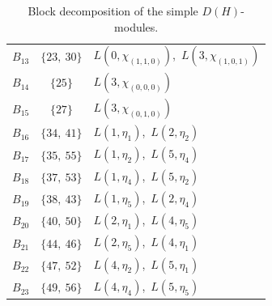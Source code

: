 \begin{table}[ht]
\begin{tabular}{c|c|l}
$B_{13}$ & $\{23,\ 30\}$ & $L(0,\chi_{(1,1,0)})$,\ $L(3,\chi_{(1,0,1)})$ \\
$B_{14}$ & $\{25\}$ & $L(3,\chi_{(0,0,0)})$ \\
$B_{15}$ & $\{27\}$ & $L(3,\chi_{(0,1,0)})$ \\
$B_{16}$ & $\{34,\ 41\}$ & $L(1,\eta_{1})$,\ $L(2,\eta_{2})$ \\
$B_{17}$ & $\{35,\ 55\}$ & $L(1,\eta_{2})$,\ $L(5,\eta_{4})$ \\
$B_{18}$ & $\{37,\ 53\}$ & $L(1,\eta_{4})$,\ $L(5,\eta_{2})$ \\
$B_{19}$ & $\{38,\ 43\}$ & $L(1,\eta_{5})$,\ $L(2,\eta_{4})$ \\
$B_{20}$ & $\{40,\ 50\}$ & $L(2,\eta_{1})$,\ $L(4,\eta_{5})$ \\
$B_{21}$ & $\{44,\ 46\}$ & $L(2,\eta_{5})$,\ $L(4,\eta_{1})$ \\
$B_{22}$ & $\{47,\ 52\}$ & $L(4,\eta_{2})$,\ $L(5,\eta_{1})$ \\
$B_{23}$ & $\{49,\ 56\}$ & $L(4,\eta_{4})$,\ $L(5,\eta_{5})$ \\
\end{tabular}
\caption{Block decomposition of the simple $D(H)$-modules.}
\label{tab:block-decomposition}
\end{table}

